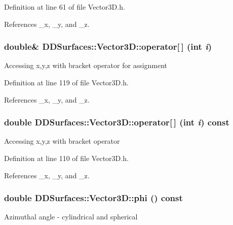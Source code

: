 Definition at line 61 of file Vector3D.h.

References \_\-x, \_\-y, and \_\-z.\hypertarget{class_d_d_surfaces_1_1_vector3_d_ae4e1eca62cf8f1cae89ab8b8e2f2f132}{
\subsubsection[{operator[]}]{\setlength{\rightskip}{0pt plus 5cm}double\& DDSurfaces::Vector3D::operator\mbox{[}$\,$\mbox{]} (int {\em i})}}
\label{class_d_d_surfaces_1_1_vector3_d_ae4e1eca62cf8f1cae89ab8b8e2f2f132}
Accessing x,y,z with bracket operator for assignment 

Definition at line 119 of file Vector3D.h.

References \_\-x, \_\-y, and \_\-z.\hypertarget{class_d_d_surfaces_1_1_vector3_d_a9bb1c34004ed33fb828eed6e5086988d}{
\subsubsection[{operator[]}]{\setlength{\rightskip}{0pt plus 5cm}double DDSurfaces::Vector3D::operator\mbox{[}$\,$\mbox{]} (int {\em i}) const}}
\label{class_d_d_surfaces_1_1_vector3_d_a9bb1c34004ed33fb828eed6e5086988d}
Accessing x,y,z with bracket operator 

Definition at line 110 of file Vector3D.h.

References \_\-x, \_\-y, and \_\-z.\hypertarget{class_d_d_surfaces_1_1_vector3_d_ae2bc1c0c08626818eda33bd2e7c6ace5}{
\subsubsection[{phi}]{\setlength{\rightskip}{0pt plus 5cm}double DDSurfaces::Vector3D::phi () const}}
\label{class_d_d_surfaces_1_1_vector3_d_ae2bc1c0c08626818eda33bd2e7c6ace5}
Azimuthal angle -\/ cylindrical and spherical 


